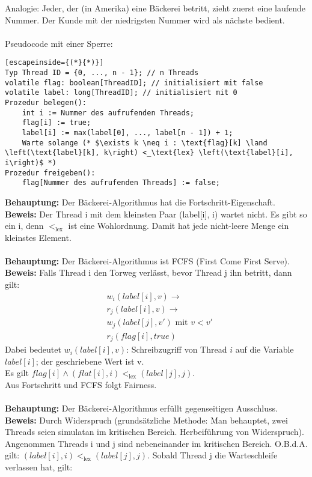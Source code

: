 Analogie: Jeder, der (in Amerika) eine Bäckerei betritt, zieht zuerst eine laufende Nummer. Der Kunde mit der niedrigsten Nummer wird als nächste bedient.\\
\\
Pseudocode mit einer Sperre:\\
\begin{lstlisting}[escapeinside={(*}{*)}]
Typ Thread ID = {0, ..., n - 1}; // n Threads
volatile flag: boolean[ThreadID]; // initialisiert mit false
volatile label: long[ThreadID]; // initialisiert mit 0
Prozedur belegen():
    int i := Nummer des aufrufenden Threads;
    flag[i] := true;
    label[i] := max(label[0], ..., label[n - 1]) + 1;
    Warte solange (* $\exists k \neq i : \text{flag}[k] \land \left(\text{label}[k], k\right) <_\text{lex} \left(\text{label}[i], i\right)$ *)
Prozedur freigeben():
    flag[Nummer des aufrufenden Threads] := false;
\end{lstlisting}
\textbf{Behauptung:} Der Bäckerei-Algorithmus hat die Fortschritt-Eigenschaft.\\
\textbf{Beweis:} Der Thread i mit dem kleinsten Paar (label[i], i) wartet nicht. Es gibt so ein i, denn $<_\text{lex}$ ist eine Wohlordnung. Damit hat jede nicht-leere Menge ein kleinstes Element.\\
\\
\textbf{Behauptung:} Der Bäckerei-Algorithmus ist FCFS (First Come First Serve).\\
\textbf{Beweis:} Falls Thread i den Torweg verlässt, bevor Thread j ihn betritt, dann gilt:
\begin{align*}
	& w_i\left(label[i], v\right) \rightarrow\\
	& r_j\left(label[i], v\right) \rightarrow\\
	& w_j\left(label[j], v'\right) \text{ mit } v < v'\\
	& r_j\left(flag[i], true\right)
\end{align*}
Dabei bedeutet $w_i\left(label[i], v\right)$: Schreibzugriff von Thread $i$ auf die Variable $label[i]$; der geschriebene Wert ist v.\\
Es gilt $flag[i] \land \left(flat[i], i\right) <_\text{lex} \left(label[j], j\right)$.\\
Aus Fortschritt und FCFS folgt Fairness.\\
\\
\textbf{Behauptung:} Der Bäckerei-Algorithmus erfüllt gegenseitigen Ausschluss.\\
\textbf{Beweis:} Durch Widerspruch (grundsätzliche Methode: Man behauptet, zwei Threads seien simulatan im kritischen Bereich. Herbeiführung von Widerspruch). Angenommen Threads i und j sind nebeneinander im kritischen Bereich. O.B.d.A. gilt: $\left(label[i], i\right) <_\text{lex} \left(label[j], j\right)$. Sobald Thread j die Warteschleife verlassen hat, gilt:
